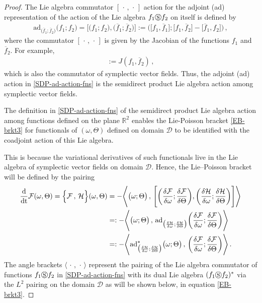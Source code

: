 \documentclass[11pt, oneside]{article}   	%
\numberwithin{equation}{section}
\theoremstyle{plain}
\theoremstyle{definition}
\theoremstyle{remark}
\newcommand{\<}{\langle}
\renewcommand{\>}{\rangle}
\def\dt{\textnormal{dt}}
\begin{document}
\begin{proof}
The Lie algebra commutator $[\,\cdot\,,\,\cdot\,]$ action for the adjoint (ad) representation of the action of the Lie algebra $f_1\circledS f_2$ on itself is defined by \cite{HMR1998}
\begin{align}
{\mathrm{ad}}_{\big(\overline{f}_1;\overline{f}_2\big)}\big(f_1;f_2\big) 
=
\Big[ \big(f_1;f_2\big) , \big(\overline{f}_1;\overline{f}_2\big)\Big] 
:=
\Big( \big[ f_1,\overline{f}_1 \big] ; \big[ f_1,\overline{f}_2 \big] - \big[ \overline{f}_1,f_2 \big]\Big)\,,
\label{SDP-ad-action-fns}
\end{align}
where the commutator $[\,\cdot\,,\,\cdot\,]$ is given by the Jacobian of the functions $f_1$ and $\overline{f}_2$. For example,
\begin{align}
[ f_1,\overline{f}_2 ]:= J(f_1,\overline{f}_2)
\,,\label{SDP-commutator-fns}
\end{align}
which is also the commutator of symplectic vector fields. Thus, the adjoint (ad) action in \eqref{SDP-ad-action-fns} is the semidirect product Lie algebra action among symplectic vector fields. 
\bigskip

The definition in \eqref{SDP-ad-action-fns} of the semidirect product Lie algebra action among functions defined on the plane $\mathbb{R}^2$ enables the Lie-Poisson bracket \eqref{EB-brkt3} for functionals of $(\omega,\Theta)$ defined on domain $\mathcal D$ to be identified with the coadjoint action of this Lie algebra. 

\smallskip
This is because the variational derivatives of such functionals live in the Lie algebra of symplectic vector fields on domain $\mathcal D$. Hence, the Lie--Poisson bracket will be defined by the pairing 
\begin{align}
\begin{split}
 \frac{\mathrm{d}}{\dt} { \mathcal{F}}(\omega,\Theta)
 =
\Big\{\mathcal{F}\,,\,{\mathcal{H}}\Big\}(\omega,\Theta)
&=
- \Bigg\langle
\big(\omega ; \Theta\big) \,,\,\Bigg[ \bigg(\frac{\delta \mathcal{F}}{\delta \omega} ; \frac{\delta \mathcal{F}}{\delta \Theta}\bigg), 
\bigg(\frac{\delta \mathcal{H}}{\delta \omega} ;\frac{\delta \mathcal{H}}{\delta \Theta} \bigg)\Bigg] \Bigg\rangle
\\&=:
- \Bigg\langle \big(\omega ; \Theta\big)
\,,\,
{\mathrm{ad}}_{\big(\frac{\delta \mathcal{H}}{\delta \omega};\frac{\delta \mathcal{H}}{\delta \Theta}\big)}
\bigg(\frac{\delta \mathcal{F}}{\delta \omega};\frac{\delta \mathcal{F}}{\delta \Theta}\bigg)
 \Bigg\rangle
\\&=:
- \Bigg\langle {\mathrm{ad}}^*_{\big(\frac{\delta \mathcal{H}}{\delta \omega};\frac{\delta \mathcal{H}}{\delta \Theta}\big)}\big(\omega ; \Theta\big)
\,,\,
\bigg(\frac{\delta \mathcal{F}}{\delta \omega};\frac{\delta \mathcal{F}}{\delta \Theta}\bigg)
 \Bigg\rangle
\,.
\end{split}
\label{SDP-LPB-EB}
\end{align}
The angle brackets $\langle\,\cdot\,,\,\cdot\,\rangle$ represent the pairing of the Lie algebra commutator of functions $f_1\circledS f_2$ in \eqref{SDP-ad-action-fns} with its dual Lie algebra $(f_1\circledS f_2)^*$ via the $L^2$ pairing on the domain $\mathcal D$ as will be shown below, in equation \eqref{EB-brkt3}. 


\end{proof}
\end{document}
